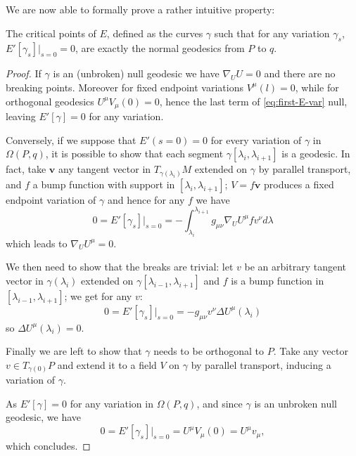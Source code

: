 We are now able to formally prove a rather intuitive property:
\begin{prop}
	The critical points of \(E\), defined as the curves \(\gamma\) such that for any variation \(\gamma_s\), \(E'[\gamma_s]\Big\vert_{s = 0} = 0\), are exactly the normal geodesics from \(P\) to \(q\).
\end{prop}
\begin{proof}
	If \(\gamma\) is an (unbroken) null geodesic we have \(\nabla_UU = 0\) and there are no breaking points. Moreover for fixed endpoint variations \(V^{\mu}(l) = 0\), while for orthogonal geodesics
	\(U^{\mu}V_{\mu}(0) = 0\), hence the last term of \eqref{eq:first-E-var} null, leaving \(E'[\gamma] = 0\) for any variation.
	
	Conversely, if we suppose that \(E'(s =0) = 0\) for every variation of \(\gamma\) in \(\Omega (P,q)\), it is possible to show that each segment \(\gamma[\lambda_i, \lambda_{i + 1}]\) is a geodesic.
	In fact, take \(\textbf{v}\) any tangent vector in \(T_{\gamma(\lambda_i)}M\)  extended on \(\gamma\) by parallel transport, and \(f\) a bump function with support in \([\lambda_i, \lambda_{i + 1}]\); \(V = f\textbf{v}\) produces a fixed endpoint variation of \(\gamma\) and hence for any \(f\) we have 
	\[
	0 = E'[\gamma_s]\vert_{s = 0} = -\int_{\lambda_i}^{\lambda_{i+1}} g_{\mu\nu}\nabla_UU^{\mu} f v^{\nu} d\lambda
	\]
	which leads to \(\nabla_UU^{\mu} = 0\).
	
	We then need to show that the breaks are trivial: let \(v\) be an arbitrary tangent vector in \(\gamma(\lambda_i)\) extended on \(\gamma[\lambda_{i - 1}, \lambda_{i + 1}]\) and \(f\) is a bump function in \([\lambda_{i - 1}, \lambda_{i + 1}]\); we get for any \(v\):
	\[
	0 = E'[\gamma_s]\vert_{s = 0} = -g_{\mu\nu}v^{\nu}\Delta U^{\mu}(\lambda_i)
	\]
	so \(\Delta U^{\mu}(\lambda_i) = 0\).
	
	Finally we are left to show that \(\gamma\) needs to be orthogonal to \(P\). Take any vector \(v \in T_{\gamma(0)}P\) and extend it to a field \(V\) on \(\gamma\) by parallel transport, inducing a variation of \(\gamma\).
	
	\noindent As \(E'[\gamma] = 0\) for any variation in \(\Omega(P, q)\), and since \(\gamma\) is an unbroken null geodesic, we have
	\[
	0 = E'[\gamma_s] \Big\vert_{s = 0} = U^{\mu}V_{\mu} (0) = U^{\mu}v_{\mu},
	\]
	which concludes.
\end{proof}


